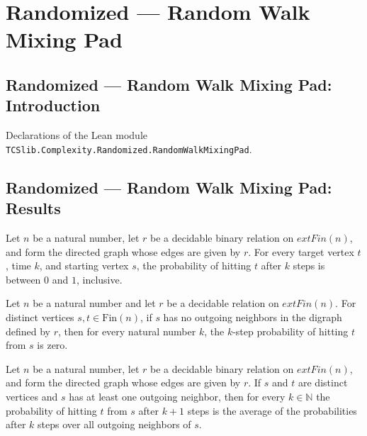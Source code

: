 \section{Randomized --- Random Walk Mixing Pad}
\subsection*{Randomized --- Random Walk Mixing Pad: Introduction}

Declarations of the Lean module \texttt{TCSlib.Complexity.Randomized.RandomWalkMixingPad}.

\subsection*{Randomized --- Random Walk Mixing Pad: Results}

\begin{theorem}
\label{Randomized.hitProb_mk_mem_Icc}
\leanok
{}
Let $n$ be a natural number, let $r$ be a decidable binary relation on $	ext{Fin}(n)$,
and form the directed graph whose edges are given by $r$. For every target vertex $t$,
time $k$, and starting vertex $s$, the probability of hitting $t$ after $k$ steps is
between $0$ and $1$, inclusive.
\end{theorem}

\begin{theorem}
\label{Randomized.hitProb_mk_eq_zero}
\leanok
{}
Let $n$ be a natural number and let $r$ be a decidable relation on $	ext{Fin}(n)$. For
distinct vertices $s,t\in\text{Fin}(n)$, if $s$ has no outgoing neighbors in the digraph
defined by $r$, then for every natural number $k$, the $k$-step probability of hitting
$t$ from $s$ is zero.
\end{theorem}

\begin{theorem}
\label{Randomized.hitProb_mk_succ}
\leanok
{}
Let $n$ be a natural number, let $r$ be a decidable binary relation on $	ext{Fin}(n)$,
and form the directed graph whose edges are given by $r$. If $s$ and $t$ are distinct
vertices and $s$ has at least one outgoing neighbor, then for every $k\in\mathbb{N}$ the
probability of hitting $t$ from $s$ after $k+1$ steps is the average of the
probabilities after $k$ steps over all outgoing neighbors of $s$.
\end{theorem}

